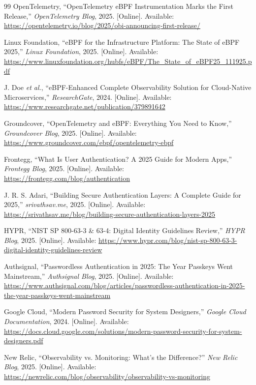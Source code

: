 \documentclass[12pt, a4paper]{article}
\begin{document}
\begin{thebibliography}{99}
OpenTelemetry, ``OpenTelemetry eBPF Instrumentation Marks the First
Release,'' \textit{OpenTelemetry Blog}, 2025. [Online]. Available:
\url{https://opentelemetry.io/blog/2025/obi-announcing-first-release/}

Linux Foundation, ``eBPF for the Infrastructure Platform: The State of
eBPF 2025,'' \textit{Linux Foundation}, 2025. [Online]. Available:
\url{https://www.linuxfoundation.org/hubfs/eBPF/The_State_of_eBPF25_111925.pdf}

J. Doe \textit{et al.}, ``eBPF-Enhanced Complete Observability Solution for
Cloud-Native Microservices,'' \textit{ResearchGate}, 2024. [Online].
Available:
\url{https://www.researchgate.net/publication/379891642}

Groundcover, ``OpenTelemetry and eBPF: Everything You Need to Know,''
\textit{Groundcover Blog}, 2025. [Online]. Available:
\url{https://www.groundcover.com/ebpf/opentelemetry-ebpf}

Frontegg, ``What Is User Authentication? A 2025 Guide for Modern Apps,''
\textit{Frontegg Blog}, 2025. [Online]. Available:
\url{https://frontegg.com/blog/authentication}

J. R. S. Adari, ``Building Secure Authentication Layers: A Complete Guide
for 2025,'' \textit{srivathsav.me}, 2025. [Online]. Available:
\url{https://srivathsav.me/blog/building-secure-authentication-layers-2025}

HYPR, ``NIST SP 800-63-3 \& 63-4: Digital Identity Guidelines Review,''
\textit{HYPR Blog}, 2025. [Online]. Available:
\url{https://www.hypr.com/blog/nist-sp-800-63-3-digital-identity-guidelines-review}

Authsignal, ``Passwordless Authentication in 2025: The Year Passkeys Went
Mainstream,'' \textit{Authsignal Blog}, 2025. [Online]. Available:
\url{https://www.authsignal.com/blog/articles/passwordless-authentication-in-2025-the-year-passkeys-went-mainstream}

Google Cloud, ``Modern Password Security for System Designers,''
\textit{Google Cloud Documentation}, 2024. [Online]. Available:
\url{https://docs.cloud.google.com/solutions/modern-password-security-for-system-designers.pdf}

New Relic, ``Observability vs. Monitoring: What's the Difference?''
\textit{New Relic Blog}, 2025. [Online]. Available:
\url{https://newrelic.com/blog/observability/observability-vs-monitoring}


\end{thebibliography}
\end{document}

